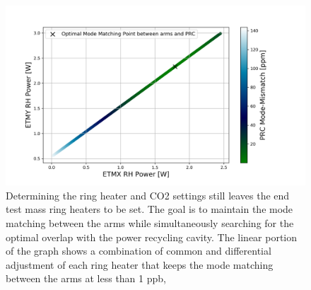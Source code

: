 	\begin{figure}[ht]
		\centering
		\includegraphics[width=1.0 \textwidth]{../Figures/ETM_TCS_Settings.png}
		\caption{Determining the ring heater and CO2 settings still leaves the end test mass ring heaters to be set.  The goal is to maintain the mode matching between the arms while simultaneously searching for the optimal overlap with the power recycling cavity. The linear portion of the graph shows a combination of common and differential adjustment of each ring heater that keeps the mode matching between the arms at less than 1 ppb, }
		\label{fig:TCS_ETM}
	\end{figure}
